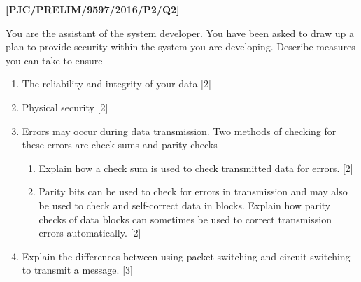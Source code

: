\item \textbf{{[}PJC/PRELIM/9597/2016/P2/Q2{]} }

You are the assistant of the system developer. You have been asked
to draw up a plan to provide security within the system you are developing.
Describe measures you can take to ensure 
\begin{enumerate}
\item The reliability and integrity of your data \hfill{}{[}2{]}
\item Physical security\hfill{} {[}2{]}
\item Errors may occur during data transmission. Two methods of checking
for these errors are check sums and parity checks
\begin{enumerate}
\item Explain how a check sum is used to check transmitted data for errors.
\hfill{}{[}2{]}
\item Parity bits can be used to check for errors in transmission and may
also be used to check and self-correct data in blocks. Explain how
parity checks of data blocks can sometimes be used to correct transmission
errors automatically.\hfill{} {[}2{]}
\end{enumerate}
\item Explain the differences between using packet switching and circuit
switching to transmit a message.\hfill{} {[}3{]}
\end{enumerate}